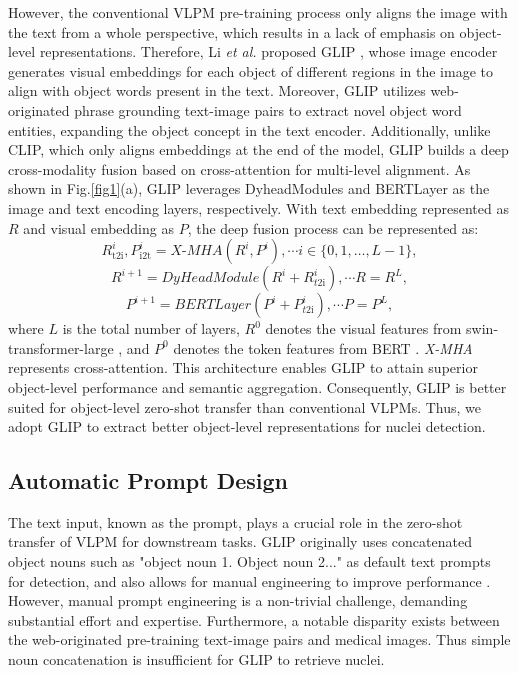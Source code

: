 \documentclass[runningheads]{llncs}
\begin{document}
However, the conventional VLPM pre-training process only aligns the image with the text from a whole perspective, which results in a lack of emphasis on object-level representations. Therefore, Li \textit{et al.} proposed GLIP \cite{li2022grounded}, whose image encoder generates visual embeddings for each object of different regions in the image to align with object words present in the text. Moreover, GLIP utilizes web-originated phrase grounding text-image pairs to extract novel object word entities, expanding the object concept in the text encoder. Additionally, unlike CLIP, which only aligns embeddings at the end of the model, GLIP builds a deep cross-modality fusion based on cross-attention \cite{chen2021crossvit} for multi-level alignment. As shown in Fig.\ref{fig1}(a), GLIP leverages DyheadModules \cite{dai2021dynamic} and BERTLayer \cite{devlin2018bert} as the image and text encoding layers, respectively. With text embedding represented as $R$ and visual embedding as $P$, the deep fusion process can be represented as:
\begin{equation}
\label{eq2}
R_{\mathrm{t} 2 \mathrm{i}}^i, P_{\mathrm{i} 2 \mathrm{t}}^i=\textit{X-MHA}\left(R^i, P^i\right), \cdots i \in\{0,1, \ldots, L-1\},
\end{equation}
\begin{equation}
\label{eq3}
R^{i+1}=\textit{DyHeadModule}\left(R^i+R_{t 2 \mathrm{i}}^i\right), \cdots R=R^L,
\end{equation}
\begin{equation}
\label{eq4}
P^{i+1}=\textit{BERTLayer}\left(P^i+P_{t 2 \mathrm{i}}^i\right), \cdots P=P^L,
\end{equation}
where $L$ is the total number of layers, $R^0$ denotes the visual features from swin-transformer-large \cite{liu2021swin}, and $P^0$ denotes the token features from BERT \cite{devlin2018bert}. \textit{X-MHA} represents cross-attention. This architecture enables GLIP to attain superior object-level performance and semantic aggregation. Consequently, GLIP is better suited for object-level zero-shot transfer than conventional VLPMs. Thus, we adopt GLIP to extract better object-level representations for nuclei detection.
\subsection{Automatic Prompt Design}
The text input, known as the prompt, plays a crucial role in the zero-shot transfer of VLPM for downstream tasks. GLIP originally uses concatenated object nouns such as "object noun 1. Object noun 2..." as default text prompts for detection, and also allows for manual engineering to improve performance \cite{li2022grounded}. However, manual prompt engineering is a non-trivial challenge, demanding substantial effort and expertise. Furthermore, a notable disparity exists between the web-originated pre-training text-image pairs and medical images. Thus simple noun concatenation is insufficient for GLIP to retrieve nuclei.
\end{document}

